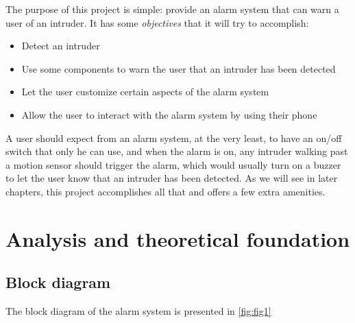 \documentclass[a4paper,12pt]{report}
\begin{document}
\vspace{1cm}

The purpose of this project is simple: provide an alarm system that can warn a user of an intruder. 
It has some \emph{objectives} that it will try to accomplish:

\begin{itemize}

\item Detect an intruder
\item Use some components to warn the user that an intruder has been detected
\item Let the user customize certain aspects of the alarm system
\item Allow the user to interact with the alarm system by using their phone

\end{itemize}

\vspace{1cm}

A user should expect from an alarm system, at the very least, to have an on/off switch that only he can use, and when the alarm is on, any intruder walking past a motion sensor should trigger the alarm, which would usually turn on a buzzer to let the user know that an intruder has been detected. As we will see in later chapters, this project accomplishes all that and offers a few extra amenities.

\chapter{Analysis and theoretical foundation}

\colorbox{blue!20}{}

\vspace{1cm}

\section{Block diagram}

The block diagram of the alarm system is presented in \autoref{fig:fig1}
\end{document}

